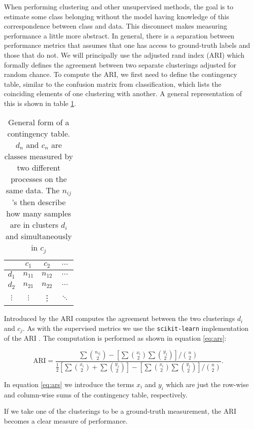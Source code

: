 When performing clustering and other unsupervised methods, the goal is to estimate some class belonging without the model having knowledge of this correspondence between class and data. This disconnect makes measuring performance a little more abstract. In general, there is a separation between performance metrics that assumes that one has access to ground-truth labels and those that do not. We will principally use the adjusted rand index (ARI) which formally defines the agreement between two separate clusterings adjusted for random chance. To compute the ARI, we first need to define the contingency table, similar to the confusion matrix from classification, which lists the coinciding elements of one clustering with another. A general representation of this is shown in table \ref{tab:contingency}. 

\begin{table}
\centering
\caption{General form of a contingency table. $d_n$ and $c_n$ are classes measured by two different processes on the same data. The $n_{ij}$'s then describe how many samples are in clusters $d_i$ and simultaneously in $c_j$}\label{tab:contingency}
\begin{tabular}{c|ccc}
& $c_1$ &$c_2$ & $\cdots$\\
\midrule
$d_1$ & $n_{11}$ & $n_{12}$ &  $\cdots$ \\
$d_2$ & $n_{21}$ & $n_{22}$ &  $\cdots$ \\
$\vdots$ & $\vdots$ & \vdots & $\ddots$ \\
\end{tabular}
\end{table}

Introduced by \cite{Hubert1985} the ARI computes the agreement between the two clusterings $d_i$ and $c_j$. As with the supervised metrics we use the \lstinline{scikit-learn} implementation of the ARI \cite{Pedregosa2011}. The computation is performed as shown in equation \ref{eq:ars}:

\begin{equation}\label{eq:ars}
\text{ARI} = \frac{\sum  \binom{n_{ij}}{2} - \left[\sum  \binom{x_{i}}{2} \sum  \binom{y_{j}}{2}  \right]/\binom{n}{2}}{\frac{1}{2}\left[\sum  \binom{x_{i}}{2} + \sum  \binom{y_{j}}{2}  \right]- \left[\sum  \binom{x_{i}}{2} \sum  \binom{y_{j}}{2}  \right]/\binom{n}{2}}.
\end{equation}

\noindent In equation \ref{eq:ars} we introduce the terms $x_i$ and $y_i$ which are just the row-wise and column-wise sums of the contingency table, respectively.

If we take one of the clusterings to be a ground-truth measurement, the ARI becomes a clear measure of performance. 